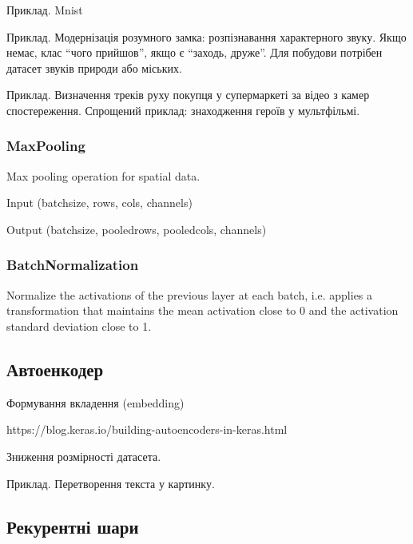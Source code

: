 Приклад. Mnist

Приклад. Модернізація розумного замка: розпізнавання характерного звуку. Якщо немає, клас ``чого прийшов'', якщо є ``заходь, друже''. Для побудови потрібен датасет звуків природи або міських.

Приклад. Визначення треків руху покупця у супермаркеті за відео з камер спостереження. Спрощений приклад: знаходження героїв у мультфільмі. 



\subsubsection{MaxPooling}

Max pooling operation for spatial data.

Input (batchsize, rows, cols, channels) 

Output (batchsize, pooledrows, pooledcols, channels)

\subsubsection{BatchNormalization}

Normalize the activations of the previous layer at each batch, i.e. applies a transformation that maintains the mean activation close to 0 and the activation standard deviation close to 1.


\subsection{Автоенкодер}

Формування вкладення (embedding)

https://blog.keras.io/building-autoencoders-in-keras.html

Зниження розмірності датасета.

Приклад. Перетворення текста у картинку.



\subsection{Рекурентні шари}

